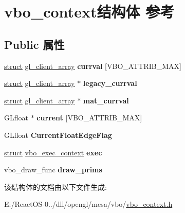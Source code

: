 \hypertarget{structvbo__context}{}\section{vbo\+\_\+context结构体 参考}
\label{structvbo__context}
\subsection*{Public 属性}
\begin{DoxyCompactItemize}
\item 
\mbox{\label{structvbo__context_af8246db894d53ec5d137ee538ebc0ad0}} 
\hyperlink{interfacestruct}{struct} \hyperlink{structgl__client__array}{gl\+\_\+client\+\_\+array} {\bfseries currval} \mbox{[}V\+B\+O\+\_\+\+A\+T\+T\+R\+I\+B\+\_\+\+M\+AX\mbox{]}
\item 
\mbox{\label{structvbo__context_a33bc3c1969810b43d8315129eaf1d16c}} 
\hyperlink{interfacestruct}{struct} \hyperlink{structgl__client__array}{gl\+\_\+client\+\_\+array} $\ast$ {\bfseries legacy\+\_\+currval}
\item 
\mbox{\label{structvbo__context_aec04ef41b37d3c71369f6f6ccddda284}} 
\hyperlink{interfacestruct}{struct} \hyperlink{structgl__client__array}{gl\+\_\+client\+\_\+array} $\ast$ {\bfseries mat\+\_\+currval}
\item 
\mbox{\label{structvbo__context_aa7c7ad061a2504dae5c18d466324e9cf}} 
G\+Lfloat $\ast$ {\bfseries current} \mbox{[}V\+B\+O\+\_\+\+A\+T\+T\+R\+I\+B\+\_\+\+M\+AX\mbox{]}
\item 
\mbox{\label{structvbo__context_a31e7cd2e24dc6767fd211eee8de403e2}} 
G\+Lfloat {\bfseries Current\+Float\+Edge\+Flag}
\item 
\mbox{\label{structvbo__context_ab36e8bb6b5f3d2f78d10a158ea3620f4}} 
\hyperlink{interfacestruct}{struct} \hyperlink{structvbo__exec__context}{vbo\+\_\+exec\+\_\+context} {\bfseries exec}
\item 
\mbox{\label{structvbo__context_a0147a3ebdc959ae716d4423bcd4edb51}} 
vbo\+\_\+draw\+\_\+func {\bfseries draw\+\_\+prims}
\end{DoxyCompactItemize}


该结构体的文档由以下文件生成\+:\begin{DoxyCompactItemize}
\item 
E\+:/\+React\+O\+S-\/0../dll/opengl/mesa/vbo/\hyperlink{vbo__context_8h}{vbo\+\_\+context.\+h}\end{DoxyCompactItemize}
